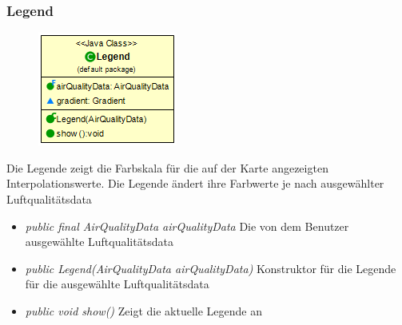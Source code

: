 \subsubsection{Legend}
\begin{minipage}{0.3\textwidth}
    \begin{figure}[H]
        \includegraphics[scale = 0.5
        ]{media/view/map/Legend_Class.png}
    \end{figure}
    \end{minipage} \hfill
    \begin{minipage}{0.6\textwidth}
Die Legende zeigt die Farbskala für die auf der Karte angezeigten Interpolationswerte. Die Legende ändert ihre Farbwerte je nach ausgewählter Luftqualitätsdata
\end{minipage}
\begin{itemize} [noitemsep]
    \item \emph{public final AirQualityData airQualityData} Die von dem Benutzer ausgewählte Luftqualitätsdata
    \item \emph{public Legend(AirQualityData airQualityData)} Konstruktor für die Legende für die ausgewählte Luftqualitätsdata
    \item \emph{public void show()} Zeigt die aktuelle Legende an
\end{itemize}

